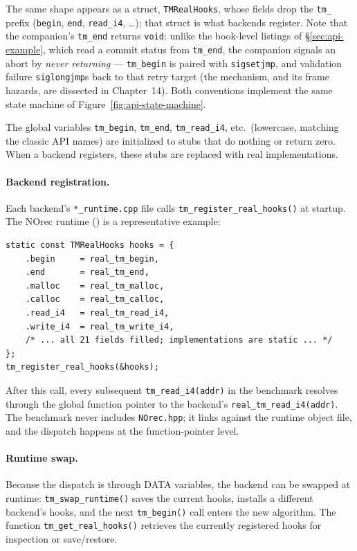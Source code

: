\noindent
The same shape appears as a struct, \texttt{TMRealHooks}, whose fields drop
the \texttt{tm\_} prefix (\texttt{begin}, \texttt{end}, \texttt{read\_i4},
\ldots); that struct is what backends register.  Note that the companion's
\texttt{tm\_end} returns \texttt{void}: unlike the book-level listings of
\S\ref{sec:api-example}, which read a commit status from \texttt{tm\_end},
the companion signals an abort by \emph{never returning} --- \texttt{tm\_begin}
is paired with \texttt{sigsetjmp}, and validation failure \texttt{siglongjmp}s
back to that retry target (the mechanism, and its frame hazards, are dissected
in Chapter~14).  Both conventions implement the same state machine of
Figure~\ref{fig:api-state-machine}.

\noindent
The global variables \texttt{tm\_begin}, \texttt{tm\_end},
\texttt{tm\_read\_i4}, etc.\ (lowercase, matching the classic API names)
are initialized to stubs that do nothing or return zero.  When a backend
registers, these stubs are replaced with real implementations.

\paragraph{Backend registration.}
Each backend's \texttt{*\_runtime.cpp} file calls
\texttt{tm\_register\_real\_hooks()} at startup.  The NOrec runtime
() is a representative
example:

\begin{lstlisting}[caption={NOrec hook registration (\texttt{NOrec\_runtime.cpp}, abridged).}]
static const TMRealHooks hooks = {
    .begin     = real_tm_begin,
    .end       = real_tm_end,
    .malloc    = real_tm_malloc,
    .calloc    = real_tm_calloc,
    .read_i4   = real_tm_read_i4,
    .write_i4  = real_tm_write_i4,
    /* ... all 21 fields filled; implementations are static ... */
};
tm_register_real_hooks(&hooks);
\end{lstlisting}

\noindent
After this call, every subsequent \texttt{tm\_read\_i4(addr)} in the
benchmark resolves through the global function pointer to the backend's
\texttt{real\_tm\_read\_i4(addr)}.  The benchmark never includes
\texttt{NOrec.hpp}; it links against the runtime object file, and the
dispatch happens at the function-pointer level.

\paragraph{Runtime swap.}
Because the dispatch is through DATA variables, the backend can be swapped at
runtime: \texttt{tm\_swap\_runtime()} saves the current hooks, installs a
different backend's hooks, and the next \texttt{tm\_begin()} call enters the
new algorithm.  The function \texttt{tm\_get\_real\_hooks()} retrieves the
currently registered hooks for inspection or save/restore.

